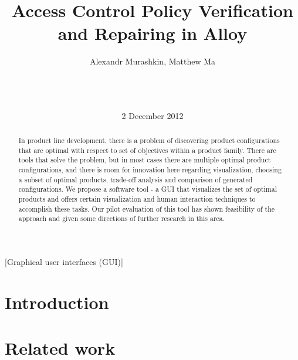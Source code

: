 \documentclass{acm_proc_article-sp}
\begin{document}
\title{Access Control Policy Verification and Repairing in Alloy}


\author{
\alignauthor Alexandr Murashkin, Matthew Ma \\
       \\
       \\
       \\
}
\date{2 December 2012}
\maketitle

\begin{abstract}
In product line development, there is a problem of discovering product configurations that are optimal with respect to set of objectives within a product family. There are tools that solve the problem, but in most cases there are multiple optimal product configurations, and there is room for innovation here regarding visualization, choosing a subset of optimal products, trade-off analysis and comparison of generated configurations. We propose a software tool - a GUI that visualizes the set of optimal products and offers certain visualization and human interaction techniques to accomplish these tasks. Our pilot evaluation of this tool has shown feasibility of the approach and given some directions of further research in this area.  
\end{abstract}


[Graphical user interfaces (GUI)]



\section{Introduction}




\section{Related work}
\end{document}
